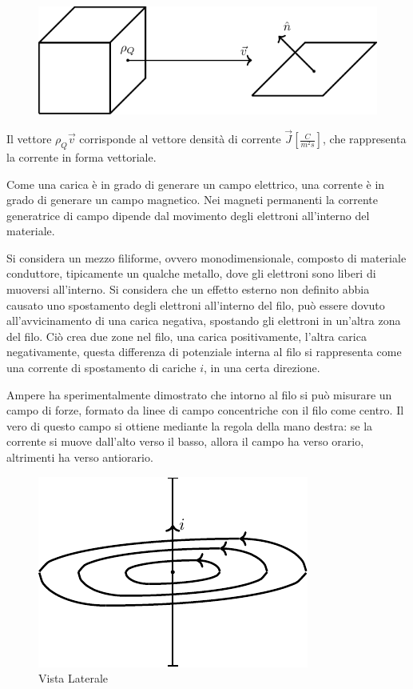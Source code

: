 \documentclass{article}
\numberwithin{equation}{subsection}
\begin{document}
\begin{figure}[H]%
    \centering
    \includegraphics{portata.pdf}
    \label{fig:portata}
\end{figure}

Il vettore $\rho_Q\vec{v}$ corrisponde al vettore densità di corrente $\vec{J}\displaystyle\left[\frac{C}{m^2s}\right]$, che rappresenta la corrente in forma vettoriale. 



Come una carica è in grado di generare un campo elettrico, una corrente è in grado di generare un campo magnetico. Nei magneti permanenti la corrente generatrice di campo 
dipende dal movimento degli elettroni all'interno del materiale. 

Si considera un mezzo filiforme, ovvero monodimensionale, composto di materiale conduttore, tipicamente un qualche 
metallo, dove gli elettroni sono liberi di muoversi all'interno. Si considera che un effetto esterno non definito abbia causato uno spostamento degli elettroni all'interno del filo, 
può essere dovuto all'avvicinamento di una carica negativa, spostando gli elettroni in un'altra zona del filo. Ciò crea due zone nel filo, una carica positivamente, l'altra 
carica negativamente, questa differenza di potenziale interna al filo si rappresenta come una corrente di spostamento di cariche $i$, in una certa direzione. 

Ampere ha sperimentalmente dimostrato che intorno al filo si può misurare un campo di forze, formato da linee di campo concentriche con il filo come centro. Il vero di questo 
campo si ottiene mediante la regola della mano destra: se la corrente si muove dall'alto verso il basso, allora il campo ha verso orario, altrimenti ha verso antiorario. 

\begin{figure}[H]%
    \centering
    \includegraphics{corrente-filo.pdf}
    \caption{Vista Laterale}
    \label{fig:corrente-filo}
\end{figure}
\end{document}
